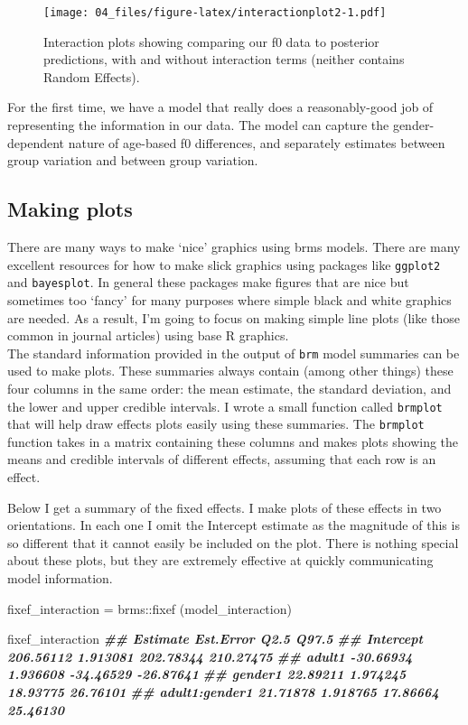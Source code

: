 \documentclass[
]{book}
\newenvironment{Shaded}{\begin{snugshade}}{\end{snugshade}}
\newcommand{\DocumentationTok}[1]{\textcolor[rgb]{0.56,0.35,0.01}{\textbf{\textit{#1}}}}
\newcommand{\FunctionTok}[1]{\textcolor[rgb]{0.00,0.00,0.00}{#1}}
\newcommand{\NormalTok}[1]{#1}
\newcommand{\OtherTok}[1]{\textcolor[rgb]{0.56,0.35,0.01}{#1}}
\newcommand{\SpecialCharTok}[1]{\textcolor[rgb]{0.00,0.00,0.00}{#1}}
\begin{document}
\begin{figure}
\centering
\texttt{[image: 04\_files/figure-latex/interactionplot2-1.pdf]}
\caption{\label{fig:interactionplot2}Interaction plots showing comparing our f0 data to posterior predictions, with and without interaction terms (neither contains Random Effects).}
\end{figure}

For the first time, we have a model that really does a reasonably-good job of representing the information in our data. The model can capture the gender-dependent nature of age-based f0 differences, and separately estimates between group variation and between group variation.

\hypertarget{making-plots}{%
\subsection{Making plots}\label{making-plots}}

There are many ways to make `nice' graphics using brms models. There are many excellent resources for how to make slick graphics using packages like \texttt{ggplot2} and \texttt{bayesplot}. In general these packages make figures that are nice but sometimes too `fancy' for many purposes where simple black and white graphics are needed. As a result, I'm going to focus on making simple line plots (like those common in journal articles) using base R graphics.\\
The standard information provided in the output of \texttt{brm} model summaries can be used to make plots. These summaries always contain (among other things) these four columns in the same order: the mean estimate, the standard deviation, and the lower and upper credible intervals. I wrote a small function called \texttt{brmplot} that will help draw effects plots easily using these summaries. The \texttt{brmplot} function takes in a matrix containing these columns and makes plots showing the means and credible intervals of different effects, assuming that each row is an effect.

Below I get a summary of the fixed effects. I make plots of these effects in two orientations. In each one I omit the Intercept estimate as the magnitude of this is so different that it cannot easily be included on the plot. There is nothing special about these plots, but they are extremely effective at quickly communicating model information.

\begin{Shaded}
\begin{Highlighting}[]
\NormalTok{fixef\_interaction }\OtherTok{=}\NormalTok{ brms}\SpecialCharTok{::}\FunctionTok{fixef}\NormalTok{ (model\_interaction)}

\NormalTok{fixef\_interaction}
\DocumentationTok{\#\#                 Estimate Est.Error      Q2.5     Q97.5}
\DocumentationTok{\#\# Intercept      206.56112  1.913081 202.78344 210.27475}
\DocumentationTok{\#\# adult1         {-}30.66934  1.936608 {-}34.46529 {-}26.87641}
\DocumentationTok{\#\# gender1         22.89211  1.974245  18.93775  26.76101}
\DocumentationTok{\#\# adult1:gender1  21.71878  1.918765  17.86664  25.46130}
\end{Highlighting}
\end{Shaded}
\end{document}
